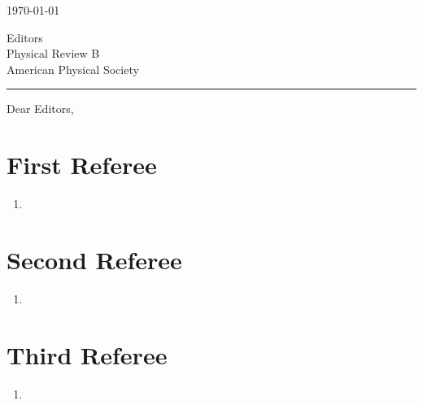 \documentclass[12pt]{article}
\begin{document}
\fontsize{12pt}{14pt}\selectfont

\begin{flushright}
    \today
\end{flushright}
\begin{flushleft}
Editors
\\
Physical Review B
\\
American Physical Society
\end{flushleft}
\vspace{-5mm}

\noindent\rule{\linewidth}{1.2pt}

\vspace{5mm}
\fontsize{12pt}{18pt}\selectfont
\noindent Dear Editors,

\bigskip

\section*{First Referee}
\begin{enumerate}
    \item 
\end{enumerate}

\section*{Second Referee}
\begin{enumerate}
    \item 
\end{enumerate}

\section*{Third Referee}
\begin{enumerate}
    \item 
\end{enumerate}
\end{document}

